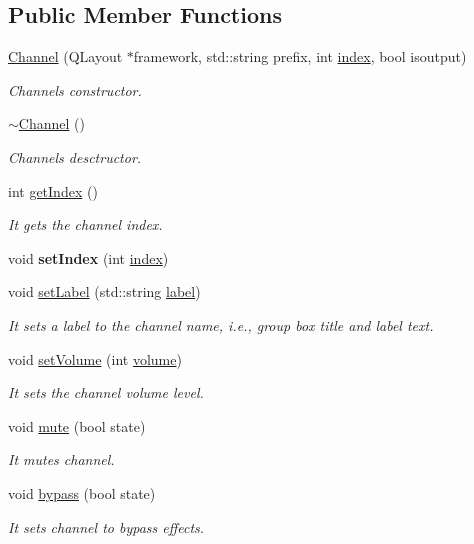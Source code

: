 \subsection*{Public Member Functions}
\begin{DoxyCompactItemize}
\item 
\hyperlink{class_channel_a3a5079024e870e5188f7af98772ae38c}{Channel} (Q\+Layout $\ast$framework, std\+::string prefix, int \hyperlink{class_channel_a992b8f195f395a64b4e966886bb41f00}{index}, bool isoutput)
\begin{DoxyCompactList}\small\item\em Channels constructor. \end{DoxyCompactList}\item 
\mbox{\label{class_channel_a5f15ebd302464069f1a9e3f0ded14482}} 
\hyperlink{class_channel_a5f15ebd302464069f1a9e3f0ded14482}{$\sim$\+Channel} ()
\begin{DoxyCompactList}\small\item\em Channels desctructor. \end{DoxyCompactList}\item 
int \hyperlink{class_channel_af0427a10e1713ba8327df0b0cd0fb2f5}{get\+Index} ()
\begin{DoxyCompactList}\small\item\em It gets the channel index. \end{DoxyCompactList}\item 
\mbox{\label{class_channel_a21286e2c4add83ea96e2636e87e9871b}} 
void {\bfseries set\+Index} (int \hyperlink{class_channel_a992b8f195f395a64b4e966886bb41f00}{index})
\item 
void \hyperlink{class_channel_a1d0ac75e7416c18c3695de418e9137e1}{set\+Label} (std\+::string \hyperlink{class_channel_a66a7e30d0b8c6ee9c0b0d537b59bd695}{label})
\begin{DoxyCompactList}\small\item\em It sets a label to the channel name, i.\+e., group box title and label text. \end{DoxyCompactList}\item 
void \hyperlink{class_channel_a381d4ad81038cb9bcf393fa47b13cdb0}{set\+Volume} (int \hyperlink{class_channel_aa8977e4605932b2201b03ebf3aa14ffd}{volume})
\begin{DoxyCompactList}\small\item\em It sets the channel volume level. \end{DoxyCompactList}\item 
void \hyperlink{class_channel_a88f542e0f6d1e1d384ad8bf79a9e305b}{mute} (bool state)
\begin{DoxyCompactList}\small\item\em It mutes channel. \end{DoxyCompactList}\item 
void \hyperlink{class_channel_a2574d67b3f0d3f90c04a6154b96e303a}{bypass} (bool state)
\begin{DoxyCompactList}\small\item\em It sets channel to bypass effects. \end{DoxyCompactList}\end{DoxyCompactItemize}
